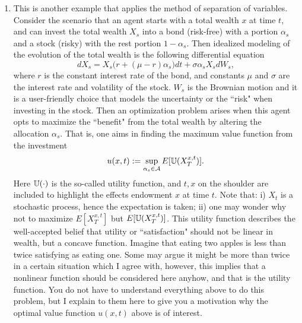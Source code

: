 \documentclass[6pt]{article}
\newtheorem{solution}{Solution}
\numberwithin{equation}{section}
\def\mathbb{\Bbb}
\begin{document}
\begin{enumerate}
\begin{solution}
(iii)-(iv).
When $D=L=h=1$ (should have assumed $h=1$), the approximate solution takes the form
\[u^N(x,t)=\sum_{k=1}^{N} \frac{8(-1)^k}{(2k-1)^2\pi^2}  \big(\cos (2k-1)\pi t\big)\big(\sin (2k-1)\pi x\big).\]

\begin{figure}[h!]%
  \centering
  \texttt{[image: hw2figure5.eps]}\\
  \caption{Graphes of $u^{10}(x,t)$ at different times.  Note that all satisfy the DBC and there are certain periodicity in these solutions.}\label{figure4}
\end{figure}

\end{solution}


\item  This is another example that applies the method of separation of variables.  Consider the scenario that an agent starts with a total wealth $x$ at time $t$, and can invest the total wealth $X_s$ into a bond (risk-free) with a portion $\alpha_s$ and a stock (risky) with the rest portion $1-\alpha_s$.  Then idealized modeling of the evolution of the total wealth is the following differential equation
\[dX_s=X_s\big(r+(\mu-r)\alpha_s\big)dt+\sigma \alpha_sX_sdW_s,\]
where $r$ is the constant interest rate of the bond, and constants $\mu$ and $\sigma$ are the interest rate and volatility of the stock.  $W_s$ is the Brownian motion and it is a user-friendly choice that models the uncertainty or the ``risk" when investing in the stock.  Then an optimization problem arises when this agent opts to maximize the ``benefit" from the total wealth by altering the allocation $\alpha_s$.  That is, one aims in finding the maximum value function from the investment
\[u(x,t):=\sup_{\alpha_s\in\mathcal A}E[\mathbb U(X^{x,t}_T)].\]
Here $\mathbb U(\cdot)$ is the so-called utility function, and ${t,x}$ on the shoulder are included to highlight the effects endowment $x$ at time $t$.  Note that: i) $X_t$ is a stochastic process, hence the expectation is taken; ii) one may wonder why not to maximize $E[X^{x,t}_T]$ but $E[\mathbb U(X^{x,t}_T)]$.  This utility function describes the well-accepted belief that utility or ``satisfaction" should not be linear in wealth, but a concave function.  Imagine that eating two apples is less than twice satisfying as eating one.  Some may argue it might be more than twice in a certain situation which I agree with, however, this implies that a nonlinear function should be considered here anyhow, and that is the utility function.  You do not have to understand everything above to do this problem, but I explain to them here to give you a motivation why the optimal value function $u(x,t)$ above is of interest.


\end{enumerate}
\end{document}
